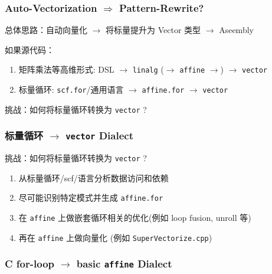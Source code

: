 \documentclass[aspectratio=169]{ctexbeamer}
\begin{document}
\begin{frame}
    \frametitle{Auto-Vectorization $\Rightarrow$ Pattern-Rewrite?}

    总体思路：自动向量化 $\rightarrow$ 将标量提升为 Vector 类型 $\rightarrow$ Aseembly

    \hspace{2em}

    如果源代码：
    \begin{enumerate}
        \item 矩阵乘法等高维形式: DSL $\rightarrow$ \texttt{linalg} ($\rightarrow$ \texttt{affine} $\rightarrow$) $\rightarrow$ \texttt{vector}
        \item 标量循环: \texttt{scf.for}/通用语言 $\rightarrow$ \texttt{affine.for} $\rightarrow$ \texttt{vector}
    \end{enumerate}

    \begin{center}
        \vspace{2em}
        挑战：如何将标量循环转换为 \texttt{vector} ?
    \end{center}

\end{frame}

\begin{frame}
    \frametitle{标量循环 $\rightarrow$ \texttt{vector} Dialect}

    \begin{center}
        挑战：如何将标量循环转换为 \texttt{vector} ?

        \vspace{1.5em}
    \end{center}

    \begin{enumerate}
        \item 从标量循环/scf/语言分析数据访问和依赖
        \item 尽可能识别特定模式并生成 \texttt{affine.for}
        \item 在 \texttt{affine} 上做嵌套循环相关的优化(例如 loop fusion, unroll 等)
        \item 再在 \texttt{affine} 上做向量化 (例如 \texttt{SuperVectorize.cpp})
    \end{enumerate}
\end{frame}

\begin{frame}[fragile]
    \frametitle{C for-loop $\rightarrow$ basic \texttt{affine} Dialect}
    \noindent
    \begin{minipage}[t]{0.3\linewidth}
        
    \end{minipage}%
    \hfill%
    \begin{minipage}[t]{0.6\linewidth}
        
    \end{minipage}
\end{frame}
\end{document}
